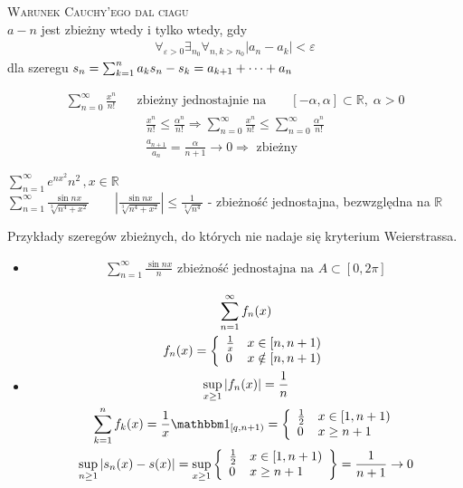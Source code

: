 \textsc{Warunek Cauchy'ego dal ciagu}\\
$ a-n $ jest zbieżny wtedy i tylko wtedy, gdy
\begin{gather*}
\forall_{\varepsilon>0}\exists_{n_0}\forall_{n,k>n_0}\left|a_n-a_k\right|<\varepsilon
\end{gather*}
dla szeregu $ s_n=\sum_{k=1}^{n}a_k\\
s_n-s_k=a_{k+1}+\dots+a_n $
\begin{prz}
\begin{align*}
\sum_{n=0}^{\infty }\frac{x^n}{n!}&&\text{zbieżny jednostajnie na }&&[-\alpha,\alpha]\subset \mathbb R ,\;\alpha>0
\end{align*}
\begin{gather*}
\frac{x^n}{n!}\le \frac{\alpha^n}{n!}
\Rightarrow
\sum_{n=0}^{\infty }\frac{x^n}{n!}
\le
\sum_{n=0}^{\infty }\frac{\alpha^n}{n!}\\
\frac{a_{n+1}}{a_n}=\frac{\alpha}{n+1}\to 0\Rightarrow\text{ zbieżny}
\end{gather*}
\end{prz}
\begin{prz}
$ \sum_{n=1}^{\infty }e^{nx^2}n^2\,,x\in \mathbb R $\\
$ \sum_{n=1}^{\infty }\frac{\sin nx}{\sqrt[3]{n^4+x^2}}\qquad\left|\frac{\sin nx}{\sqrt[3]{n^4+x^2}}\right|\le \frac{1}{\sqrt[3]{n^4}} $ - zbieżność jednostajna, bezwzględna na $ \mathbb R  $

Przykłady szeregów zbieżnych, do których nie nadaje się kryterium Weierstrassa.
\begin{itemize}
	\item 
	\begin{gather*}
	\sum_{n=1}^{\infty }\frac{\sin nx}{n}
	\text{ zbieżność jednostajna na }A\subset [0,2\pi]
	\end{gather*}
	\item \begin{gather*}
	\sum_{n=1}^{\infty }f_n(x)\\
	f_n(x)=
	\left \{
	\begin{array}{ll}
		\frac{1}{x} & x\in[n,n+1) \\
		0           & x\notin[n,n+1)
	\end{array}
	\right .\\
	\sup_{x\ge 1}\left|f_n(x)\right|=\frac{1}{n}\\
	\sum_{k=1}^{n}f_k(x)=\frac{1}{x}\mathbbm1_{[q,n+1)}=
	\left \{
	\begin{array}{ll}
		\frac{1}{2} & x\in[1,n+1) \\
		0           & x\ge n+1
	\end{array}
	\right .\\
	\sup_{n\ge1}\left|s_n(x)-s(x)\right|=\sup_{x\ge1}
	\left \{
	\begin{array}{ll}
	\frac{1}{2} & x\in[1,n+1) \\
	0           & x\ge n+1
	\end{array}
	\right \}=\frac{1}{n+1}\to0	
	\end{gather*}
\end{itemize}
\end{prz}
